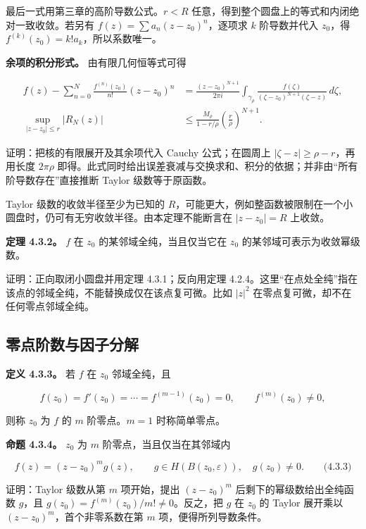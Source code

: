 \documentclass[11pt,a4paper]{article}
\begin{document}
最后一式用第三章的高阶导数公式。\(r<R\)
任意，得到整个圆盘上的等式和内闭绝对一致收敛。若另有
\(f(z)=\sum a_n(z-z_0)^n\)，逐项求 \(k\) 阶导数并代入 \(z_0\)，得
\(f^{(k)}(z_0)=k!a_k\)，所以系数唯一。

\textbf{余项的积分形式。} 由有限几何恒等式可得

\[
\begin{aligned}
f(z)-\sum_{n=0}^N\frac{f^{(n)}(z_0)}{n!}(z-z_0)^n
&=\frac{(z-z_0)^{N+1}}{2\pi i}
\int_{\gamma_\rho}\frac{f(\zeta)}{(\zeta-z_0)^{N+1}(\zeta-z)}\,d\zeta,\\
\sup_{|z-z_0|\le r}|R_N(z)|
&\le\frac{M_\rho}{1-r/\rho}\left(\frac r\rho\right)^{N+1}.
\end{aligned}
\]

证明：把核的有限展开及其余项代入 Cauchy 公式；在圆周上
\(|\zeta-z|\ge\rho-r\)，再用长度 \(2\pi\rho\)
即得。此式同时给出误差衰减与交换求和、积分的依据；并非由``所有阶导数存在''直接推断
Taylor 级数等于原函数。

Taylor 级数的收敛半径至少为已知的
\(R\)，可能更大，例如整函数被限制在一个小圆盘时，仍可有无穷收敛半径。由本定理不能断言在
\(|z-z_0|=R\) 上收敛。

\textbf{定理 4.3.2。} \(f\) 在 \(z_0\) 的某邻域全纯，当且仅当它在
\(z_0\) 的某邻域可表示为收敛幂级数。

证明：正向取闭小圆盘并用定理 4.3.1；反向用定理
4.2.4。这里``在点处全纯''指在该点的邻域全纯，不能替换成仅在该点复可微。比如
\(|z|^2\) 在零点复可微，却不在任何零点邻域全纯。

\subsection{零点阶数与因子分解}\label{ch04-s3-heading-2}

\textbf{定义 4.3.3。} 若 \(f\) 在 \(z_0\) 邻域全纯，且

\[
f(z_0)=f'(z_0)=\cdots=f^{(m-1)}(z_0)=0,
\qquad f^{(m)}(z_0)\ne0,
\]

则称 \(z_0\) 为 \(f\) 的 \(m\) 阶零点。\(m=1\) 时称简单零点。

\textbf{命题 4.3.4。} \(z_0\) 为 \(m\) 阶零点，当且仅当在其邻域内

\[
f(z)=(z-z_0)^m g(z),\qquad g\in H(B(z_0,\varepsilon)),\quad g(z_0)\ne0.
\qquad\text{(4.3.3)}
\]

证明：Taylor 级数从第 \(m\) 项开始，提出 \((z-z_0)^m\)
后剩下的幂级数给出全纯函数 \(g\)，且
\(g(z_0)=f^{(m)}(z_0)/m!\ne0\)。反之，把 \(g\) 在 \(z_0\) 的 Taylor
展开乘以 \((z-z_0)^m\)，首个非零系数在第 \(m\) 项，便得所列导数条件。
\end{document}

